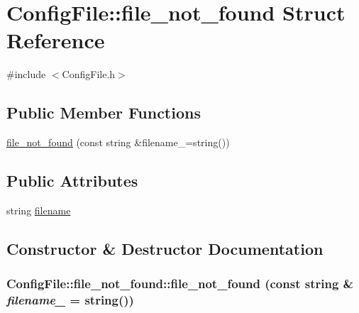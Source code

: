 \hypertarget{structConfigFile_1_1file__not__found}{
\section{ConfigFile::file\_\-not\_\-found Struct Reference}
\label{structConfigFile_1_1file__not__found}
}


{\ttfamily \#include $<$ConfigFile.h$>$}

\subsection*{Public Member Functions}
\begin{DoxyCompactItemize}
\item 
\hyperlink{structConfigFile_1_1file__not__found_ab0fa2b6e7d1891136f82d4baf124725b}{file\_\-not\_\-found} (const string \&filename\_\-=string())
\end{DoxyCompactItemize}
\subsection*{Public Attributes}
\begin{DoxyCompactItemize}
\item 
string \hyperlink{structConfigFile_1_1file__not__found_a25e11d11b1a9b0f4ca663b21816c2a9a}{filename}
\end{DoxyCompactItemize}


\subsection{Constructor \& Destructor Documentation}
\hypertarget{structConfigFile_1_1file__not__found_ab0fa2b6e7d1891136f82d4baf124725b}{
\subsubsection[{file\_\-not\_\-found}]{\setlength{\rightskip}{0pt plus 5cm}ConfigFile::file\_\-not\_\-found::file\_\-not\_\-found (const string \& {\em filename\_\-} = {\ttfamily string()})}}
\label{structConfigFile_1_1file__not__found_ab0fa2b6e7d1891136f82d4baf124725b}



